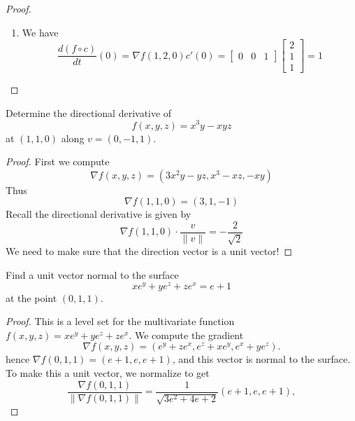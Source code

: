 \documentclass[openany]{book}
\begin{document}
\begin{proof}
\begin{enumerate}
        \item We have 
        \begin{equation*}
            \frac{d(f\circ c)}{dt}(0)=\nabla f(1,2,0)c'(0)=\begin{bmatrix}
                0 &0&1
            \end{bmatrix}\begin{bmatrix}
                2\\
                1\\
                1
            \end{bmatrix}=1
        \end{equation*}
    \end{enumerate}
\end{proof}



\begin{prob}
    Determine the directional derivative of 
    \begin{equation*}
        f(x,y,z)=x^3y-xyz
    \end{equation*}
    at $(1,1,0)$ along $v=(0,-1,1)$.
\end{prob}
\begin{proof}
    First we compute 
    \begin{equation*}
        \nabla f(x,y,z)=(3x^2y-yz, x^3-xz, -xy)
    \end{equation*}
    Thus 
    \begin{equation*}
        \nabla f(1,1,0)=(3, 1, -1)
    \end{equation*}
    Recall the directional derivative is given by 
    \begin{equation*}
        \nabla f(1,1,0)\cdot \frac{v}{\|v\|}=-\frac{2}{\sqrt{2}}
    \end{equation*}
    We need to make sure that the direction vector is a unit vector!
\end{proof}





\begin{prob}
    Find a unit vector normal to the surface
    \[xe^y+ye^z+ze^x=e+1\]
    at the point $(0,1,1)$. %
\end{prob}
\begin{proof}
    This is a level set for the multivariate function $f(x,y,z)=xe^y+ye^z+ze^x$. We compute the gradient
    \[\nabla f(x,y,z)=(e^y+ze^x,e^z+xe^y,e^x+ye^z).\]
    hence $\nabla f(0,1,1)=(e+1,e,e+1)$, and this vector is normal to the surface. To make this a unit vector, we normalize to get
    \[\frac{\nabla f(0,1,1)}{\left\|\nabla f(0,1,1)\right\|}=\frac1{\sqrt{3e^2+4e+2}}(e+1,e,e+1),\]
\end{proof}
\end{document}
